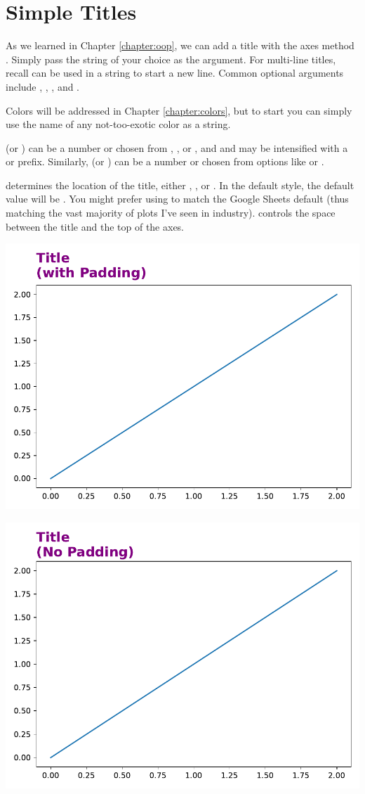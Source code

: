 \section{Simple Titles}

As we learned in Chapter \ref{chapter:oop}, we can add a title with the axes method . Simply pass the string of your choice as the argument. For multi-line titles, recall \code{\\n} can be used in a string to start a new line. Common optional arguments include , , , and . 

Colors will be addressed in Chapter \ref{chapter:colors}, but to start you can simply use the name of any not-too-exotic color as a string.

 (or ) can be a number or chosen from , , or , and  and  may be intensified with a  or  prefix. Similarly,  (or ) can be a number or chosen from options like  or .

 determines the location of the title, either , , or . In the default style, the default value will be . You might prefer using  to match the Google Sheets default (thus matching the vast majority of plots I've seen in industry). %
 controls the space between the title and the top of the axes. 



\begin{center}
    \includegraphics[width = .48\textwidth]{figures/proseplots/title-pad.pdf}
\end{center} \begin{center}
    \includegraphics[width = .48\textwidth]{figures/proseplots/title-no-pad.pdf}
\end{center}

